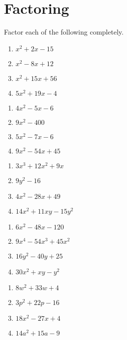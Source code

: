 \chapter{Factoring}

Factor each of the following completely.

\begin{multicols}{4}
\begin{enumerate}
\item $x^2 + 2x - 15$
\item $x^2 - 8x + 12$
\item $x^2 + 15x + 56$
\item $5x^2 + 19x - 4$
\end{enumerate}	\setcounter{Review}{\value{enumi}}
\end{multicols}
\begin{multicols}{4}
\begin{enumerate}	\setcounter{enumi}{\value{Review}}
\item $4x^2 - 5x - 6$
\item $9x^2 - 400$
\item $5x^2-7x-6$
\item $9x^2-54x+45$
\end{enumerate}	\setcounter{Review}{\value{enumi}}
\end{multicols}
\begin{multicols}{4}
\begin{enumerate}	\setcounter{enumi}{\value{Review}}
\item $3x^3+12x^2+9x$
\item $9y^2-16$
\item $4x^2-28x+49$
\item $14x^2+11xy-15y^2$
\end{enumerate}	\setcounter{Review}{\value{enumi}}
\end{multicols}
\begin{multicols}{4}
\begin{enumerate}	\setcounter{enumi}{\value{Review}}
\item $6x^2-48x-120$
\item $9x^4-54x^3+45x^2$
\item $16y^2-40y+25$
\item $30x^2+xy-y^2$
\end{enumerate}	\setcounter{Review}{\value{enumi}}
\end{multicols}
\begin{multicols}{4}
\begin{enumerate}	\setcounter{enumi}{\value{Review}}
\item $8w^2 + 33w + 4$
\item $3p^2+22p-16$
\item $18x^2-27x+4$
\item $14a^2+15a-9$
\end{enumerate}	\setcounter{Review}{\value{enumi}}
\end{multicols}

